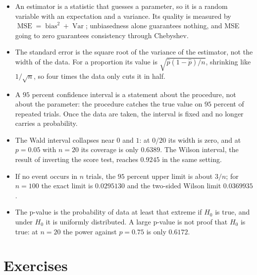 \begin{ringkasan}
\begin{itemize}
  \item An estimator is a statistic that guesses a parameter, so it is a random variable with
        an expectation and a variance. Its quality is measured by
        $\operatorname{MSE}=\operatorname{bias}^2+\operatorname{Var}$; unbiasedness alone
        guarantees nothing, and MSE going to zero guarantees consistency through
        Chebyshev.
  \item The standard error is the square root of the variance of the estimator, not the width
        of the data. For a proportion its value is $\sqrt{\hat p(1-\hat p)/n}$, shrinking like
        $1/\sqrt n$, so four times the data only cuts it in half.
  \item A $95$ percent confidence interval is a statement about the procedure, not
        about the parameter: the procedure catches the true value on $95$ percent
        of repeated trials. Once the data are taken, the interval is fixed and no longer
        carries a probability.
  \item The Wald interval collapses near $0$ and $1$: at $0/20$ its width is zero, and at
        $p=0.05$ with $n=20$ its coverage is only $0.6389$. The Wilson interval, the
        result of inverting the score test, reaches $0.9245$ in the same setting.
  \item If no event occurs in $n$ trials, the $95$ percent upper limit is about
        $3/n$; for $n=100$ the exact limit is $0.0295130$ and the two-sided Wilson
        limit $0.0369935$.
  \item The p-value is the probability of data at least that extreme if $H_0$ is true, and
        under $H_0$ it is uniformly distributed. A large p-value is not proof that $H_0$ is
        true: at $n=20$ the power against $p=0.75$ is only $0.6172$.
\end{itemize}
\end{ringkasan}

\section{Exercises}

